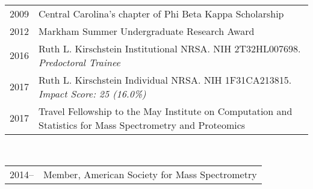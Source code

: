 \documentclass[11pt]{article}
\newcommand{\mysection}[1]{\vspace{1ex}{\bf #1} \vspace*{0.3ex}}
\begin{document}
\vspace{1ex}{\bf Academic and Professional Honors} \\
\begin{tabular}{p{0.75in}p{6.5in}}
  2009 & Central Carolina's chapter of Phi Beta Kappa Scholarship \\
  2012 & Markham Summer Undergraduate Research Award \\
  2016 & Ruth L. Kirschstein Institutional NRSA. NIH 2T32HL007698. \em{Predoctoral Trainee} \\
  2017 & Ruth L. Kirschstein Individual NRSA. NIH 1F31CA213815. \em{Impact Score: 25 (16.0\%)} \\
  2017 & Travel Fellowship to the May Institute on Computation and Statistics for Mass Spectrometry and Proteomics \\
\end{tabular}

\vspace{1ex}{\bf Professional Memberships} \\
\begin{tabular}{p{0.75in}p{6.5in}}
  2014-- & Member, American Society for Mass Spectrometry \\
\end{tabular}

\mysection{C. Contributions to Science}


\end{document}

